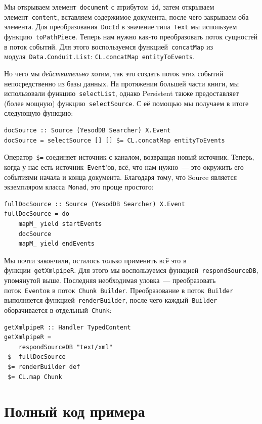 Мы открываем элемент~\lstinline'document' с атрибутом~\lstinline'id', затем
открываем элемент~\lstinline'content', вставляем содержимое документа, после
чего закрываем оба элемента. Для преобразования~\lstinline!DocId! в значение
типа~\lstinline!Text! мы используем функцию~\lstinline!toPathPiece!. Теперь нам
нужно как-то преобразовать поток сущностей в поток событий. Для этого
воспользуемся функцией~\lstinline!concatMap! из
модуля~\lstinline!Data.Conduit.List!: \lstinline`CL.concatMap entityToEvents`.

Но чего мы \emph{действительно} хотим, так это создать поток этих событий
непосредственно из базы данных. На протяжении большей части книги, мы
использовали функцию~\lstinline!selectList!, однако Persistent также
предоставляет (более мощную) функцию~\lstinline!selectSource!. С её помощью мы
получаем в итоге следующую функцию:
\begin{lstlisting}
docSource :: Source (YesodDB Searcher) X.Event
docSource = selectSource [] [] $= CL.concatMap entityToEvents
\end{lstlisting}%

Оператор~\lstinline'$=' соединяет источник с каналом, возвращая новый источник.
Теперь, когда у нас есть источник~\lstinline!Event!'ов, всё, что нам нужно~---
это окружить его событиями начала и конца документа. Благодаря тому, что Source
является экземпляром класса~\lstinline!Monad!, это проще простого:
\begin{lstlisting}
fullDocSource :: Source (YesodDB Searcher) X.Event
fullDocSource = do
    mapM_ yield startEvents
    docSource
    mapM_ yield endEvents
\end{lstlisting}

Мы почти закончили, осталось только применить всё это в
функции~\lstinline!getXmlpipeR!. Для этого мы воспользуемся
функцией~\lstinline'respondSourceDB', упомянутой выше. Последняя необходимая
уловка~--- преобразовать поток~\lstinline'Event'ов в
поток~\lstinline'Chunk Builder'. Преобразование в поток~\lstinline'Builder'
выполняется функцией~\lstinline'renderBuilder', после чего
каждый~\lstinline'Builder' оборачивается в отдельный~\lstinline'Chunk':
\begin{lstlisting}
getXmlpipeR :: Handler TypedContent
getXmlpipeR =
    respondSourceDB "text/xml"
 $  fullDocSource
 $= renderBuilder def
 $= CL.map Chunk
\end{lstlisting}

\section{Полный код примера}


